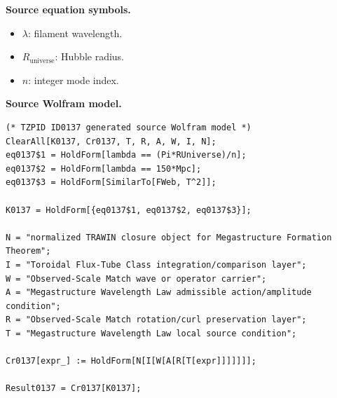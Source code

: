 \begin{minipage}[t]{0.49\linewidth}
\begingroup
\small
\raggedright
\textbf{Source equation symbols.}\par
\begin{itemize}[leftmargin=1.35em,itemsep=1pt,topsep=1pt,parsep=0pt]
    \item $\lambda$: filament wavelength.
    \item $R_{\mathrm{universe}}$: Hubble radius.
    \item $n$: integer mode index.
\end{itemize}
\endgroup
\end{minipage}\hfill
\begin{minipage}[t]{0.47\linewidth}
\begingroup
\scriptsize
\raggedright
\textbf{Source Wolfram model.}\par
\begin{Verbatim}[fontsize=\tiny,breaklines=true,breakanywhere=true]
(* TZPID ID0137 generated source Wolfram model *)
ClearAll[K0137, Cr0137, T, R, A, W, I, N];
eq0137$1 = HoldForm[lambda == (Pi*RUniverse)/n];
eq0137$2 = HoldForm[lambda == 150*Mpc];
eq0137$3 = HoldForm[SimilarTo[FWeb, T^2]];

K0137 = HoldForm[{eq0137$1, eq0137$2, eq0137$3}];

N = "normalized TRAWIN closure object for Megastructure Formation Theorem";
I = "Toroidal Flux-Tube Class integration/comparison layer";
W = "Observed-Scale Match wave or operator carrier";
A = "Megastructure Wavelength Law admissible action/amplitude condition";
R = "Observed-Scale Match rotation/curl preservation layer";
T = "Megastructure Wavelength Law local source condition";

Cr0137[expr_] := HoldForm[N[I[W[A[R[T[expr]]]]]]];

Result0137 = Cr0137[K0137];
\end{Verbatim}
\endgroup
\end{minipage}

